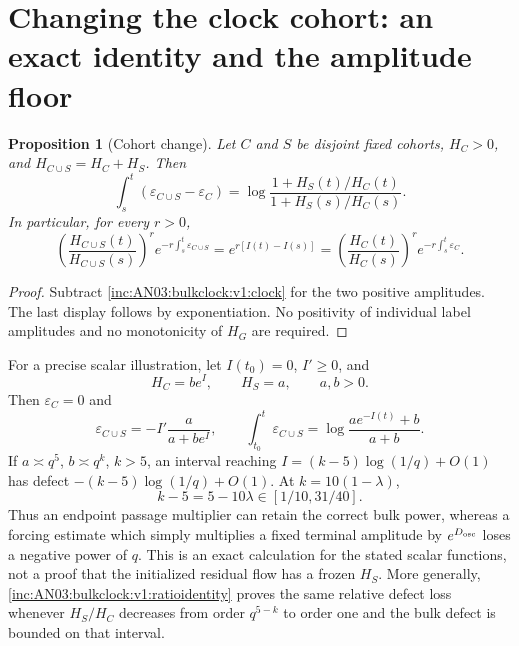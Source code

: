 \documentclass[11pt]{article}
\newtheorem{proposition}[theorem]{Proposition}
\theoremstyle{remark}\newtheorem{remark}[theorem]{Remark}
\begin{document}
\section{Changing the clock cohort: an exact identity and the amplitude floor}
\begin{proposition}[Cohort change]\label{inc:AN03:bulkclock:v1:cohortchange}
Let $C$ and $S$ be disjoint fixed cohorts, $H_C>0$, and $H_{C\cup S}=H_C+H_S$. Then
\begin{equation}\label{inc:AN03:bulkclock:v1:ratioidentity}
 \int_s^t(\varepsilon_{C\cup S}-\varepsilon_C)
 =\log\frac{1+H_S(t)/H_C(t)}{1+H_S(s)/H_C(s)}.
\end{equation}
In particular, for every $r>0$,
\[
 \left(\frac{H_{C\cup S}(t)}{H_{C\cup S}(s)}\right)^r
 e^{-r\int_s^t\varepsilon_{C\cup S}}
 =e^{r[I(t)-I(s)]}
 =\left(\frac{H_C(t)}{H_C(s)}\right)^r e^{-r\int_s^t\varepsilon_C}.
\]
\end{proposition}
\begin{proof}
Subtract \eqref{inc:AN03:bulkclock:v1:clock} for the two positive amplitudes. The last display follows by exponentiation. No positivity of individual label amplitudes and no monotonicity of $H_G$ are required.
\end{proof}

For a precise scalar illustration, let $I(t_0)=0$, $I'\ge0$, and
\[
 H_C=b e^{I},\qquad H_S=a,\qquad a,b>0.
\]
Then $\varepsilon_C=0$ and
\begin{equation}\label{inc:AN03:bulkclock:v1:floormodel}
 \varepsilon_{C\cup S}=-I'\frac{a}{a+b e^I},\qquad
 \int_{t_0}^t\varepsilon_{C\cup S}
 =\log\frac{a e^{-I(t)}+b}{a+b}.
\end{equation}
If $a\asymp q^5$, $b\asymp q^k$, $k>5$, an interval reaching $I=(k-5)\log(1/q)+O(1)$ has defect $-(k-5)\log(1/q)+O(1)$. At $k=10(1-\lambda)$,
\[
 k-5=5-10\lambda\in[1/10,31/40].
\]
Thus an endpoint passage multiplier can retain the correct bulk power, whereas a forcing estimate which simply multiplies a fixed terminal amplitude by $e^{D_{\rm osc}}$ loses a negative power of $q$. This is an exact calculation for the stated scalar functions, not a proof that the initialized residual flow has a frozen $H_S$. More generally, \eqref{inc:AN03:bulkclock:v1:ratioidentity} proves the same relative defect loss whenever $H_S/H_C$ decreases from order $q^{5-k}$ to order one and the bulk defect is bounded on that interval.
\end{document}
